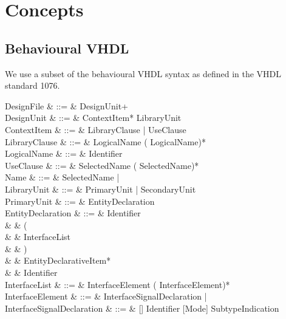 \section{Concepts}
\label{sec:vhdl-concepts}

\subsection{Behavioural VHDL}
\label{sec:vhdl-behavioural}
We use a subset of the behavioural VHDL syntax as defined in the VHDL standard 1076.

\ifplastex
\begin{VHDLcode}[\footnotesize]
\else
\begin{VHDLlongcode}[\footnotesize]
\fi
  DesignFile & ::= & DesignUnit+ \\
  DesignUnit & ::= & ContextItem* LibraryUnit \\
  ContextItem & ::= & LibraryClause | UseClause \\
  LibraryClause & ::= & \VHDLLIBRARY{} LogicalName (\VHDLComma{} LogicalName)*\VHDLSemicolon \\
  LogicalName & ::= & Identifier \\
  UseClause & ::= & \VHDLUSE{} SelectedName (\VHDLComma{} SelectedName)*\VHDLSemicolon \\
  Name & ::= & SelectedName | \\
  LibraryUnit & ::= & PrimaryUnit | SecondaryUnit \\
  PrimaryUnit & ::= & EntityDeclaration \\
  EntityDeclaration & ::= & \VHDLENTITY{} Identifier \VHDLIS \\
                              &      & \VHDLTab \VHDLPORT{} ( \\
                              &      & \VHDLTab \VHDLTab InterfaceList \\
                              &      & \VHDLTab ) \\
                              &      & \VHDLTab EntityDeclarativeItem* \\
                              &      & \VHDLEND{} Identifier \\
  InterfaceList & ::=  & InterfaceElement (\VHDLSemicolon{} InterfaceElement)* \\
  InterfaceElement & ::= & InterfaceSignalDeclaration | \\
  InterfaceSignalDeclaration & ::= & [\VHDLSIGNAL] Identifier \VHDLColon{} [Mode] SubtypeIndication \\

\end{VHDLlongcode}
\end{VHDLcode}
